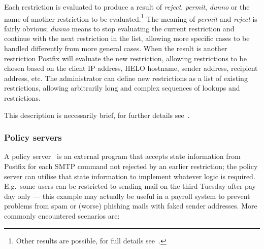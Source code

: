 \documentclass[a4paper,12pt,draft]{article}
\begin{document}
Each restriction is evaluated to produce a result of \textit{reject},
\textit{permit}, \textit{dunno\/} or the name of another restriction to be
evaluated.\footnote{Other results are possible, for full details
see~\cite{smtpd_access_readme, smtpd_per_user_control, policy-servers}.}
The meaning of \textit{permit\/} and \textit{reject\/} is fairly obvious;
\textit{dunno\/} means to stop evaluating the current restriction and
continue with the next restriction in the list, allowing more specific
cases to be handled differently from more general cases.  When the result
is another restriction Postfix will evaluate the new restriction, allowing
restrictions to be chosen based on the client IP address, HELO hostname,
sender address, recipient address, etc.  The administrator can define new
restrictions as a list of existing restrictions, allowing arbitrarily long
and complex sequences of lookups and restrictions.

This description is necessarily brief, for further details
see~\cite{smtpd_access_readme, smtpd_per_user_control, policy-servers}.


\subsubsection{Policy servers}

A policy server~\cite{policy-servers} is an external program that accepts
state information from Postfix for each SMTP command not rejected by an
earlier restriction; the policy server can utilise that state information
to implement whatever logic is required.  E.g.\ some users can be
restricted to sending mail on the third Tuesday after pay day only --- this
example may actually be useful in a payroll system to prevent problems from
spam or (worse) phishing mails with faked sender addresses.  More commonly
encountered scenarios are:
\end{document}
